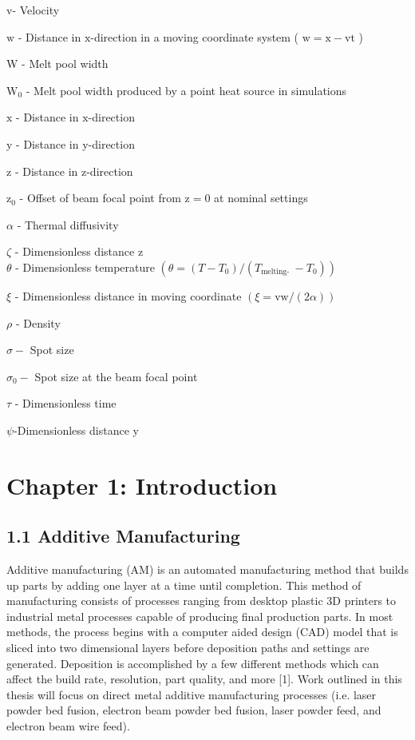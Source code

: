 \documentclass[10pt]{article}
\begin{document}
v- Velocity

$\mathrm{w}$ - Distance in $\mathrm{x}$-direction in a moving coordinate system ( $\mathrm{w}=\mathrm{x}-\mathrm{vt}$ )

W - Melt pool width

$\mathrm{W}_{0}$ - Melt pool width produced by a point heat source in simulations

$\mathrm{x}$ - Distance in $\mathrm{x}$-direction

$\mathrm{y}$ - Distance in y-direction

$\mathrm{z}$ - Distance in z-direction

$\mathrm{z}_{0}$ - Offset of beam focal point from $\mathrm{z}=0$ at nominal settings

$\alpha$ - Thermal diffusivity

$\zeta$ - Dimensionless distance z\\
$\theta$ - Dimensionless temperature $\left(\theta=\left(T-T_{0}\right) /\left(T_{\text {melting- }}-T_{0}\right)\right)$

$\xi$ - Dimensionless distance in moving coordinate $(\xi=\mathrm{vw} /(2 \alpha))$

$\rho$ - Density

$\sigma-$ Spot size

$\sigma_{0}-$ Spot size at the beam focal point

$\tau$ - Dimensionless time

$\psi$-Dimensionless distance y

\section*{Chapter 1: Introduction}
\subsection*{1.1 Additive Manufacturing}
Additive manufacturing (AM) is an automated manufacturing method that builds up parts by adding one layer at a time until completion. This method of manufacturing consists of processes ranging from desktop plastic 3D printers to industrial metal processes capable of producing final production parts. In most methods, the process begins with a computer aided design (CAD) model that is sliced into two dimensional layers before deposition paths and settings are generated. Deposition is accomplished by a few different methods which can affect the build rate, resolution, part quality, and more [1]. Work outlined in this thesis will focus on direct metal additive manufacturing processes (i.e. laser powder bed fusion, electron beam powder bed fusion, laser powder feed, and electron beam wire feed).
\end{document}
